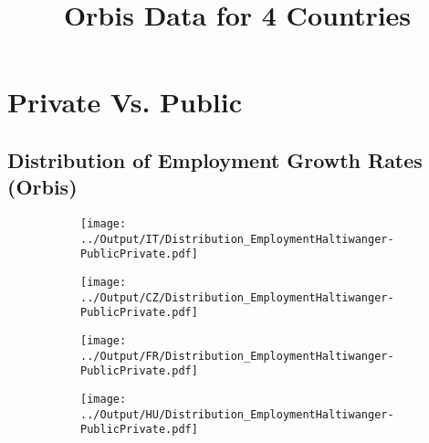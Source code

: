 \documentclass[12pt,notitlepage]{article}
\title{Orbis Data for 4 Countries}
\author{}
\date{}
\begin{document}
\maketitle
\tableofcontents
\pagebreak



\FloatBarrier
\section{Private Vs. Public} %
\label{sec:private_vs_public}
\FloatBarrier




\subsection{Distribution of Employment Growth Rates (Orbis)}
\begin{figure}[!htpb]
\centering
\begin{subfigure}{.49\textwidth}
    \centering
 \texttt{[image: ../Output/IT/Distribution\_EmploymentHaltiwanger-PublicPrivate.pdf]}
\end{subfigure}%
\begin{subfigure}{.49\textwidth}
    \centering
 \texttt{[image: ../Output/CZ/Distribution\_EmploymentHaltiwanger-PublicPrivate.pdf]}
\end{subfigure}
\begin{subfigure}{.49\textwidth}
    \centering
 \texttt{[image: ../Output/FR/Distribution\_EmploymentHaltiwanger-PublicPrivate.pdf]}
\end{subfigure}%
\begin{subfigure}{.49\textwidth}
    \centering
 \texttt{[image: ../Output/HU/Distribution\_EmploymentHaltiwanger-PublicPrivate.pdf]}
\end{subfigure}
\end{figure}
\end{document}
